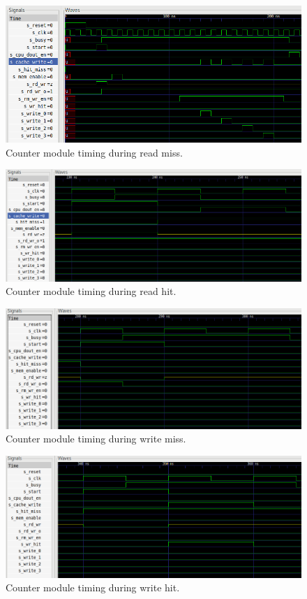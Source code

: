 \documentclass[10pt]{article}
\begin{document}
\begin{figure}[b]
    \centering
    \includegraphics[width=\textwidth]{crm.png}
    \caption{Counter module timing during read miss.}
    \label{crdmiss}
\end{figure}

\begin{figure}
    \centering
    \includegraphics[width=\textwidth]{crh.png}
    \caption{Counter module timing during read hit.}
    \label{crdhit}
\end{figure}

\begin{figure}
    \centering
    \includegraphics[width=\textwidth]{cwm.png}
    \caption{Counter module timing during write miss.}
    \label{cwrmiss}
\end{figure}

\begin{figure}
    \centering
    \includegraphics[width=\textwidth]{cwh.png}
    \caption{Counter module timing during write hit.}
    \label{cwrhit}
\end{figure}
\end{document}
